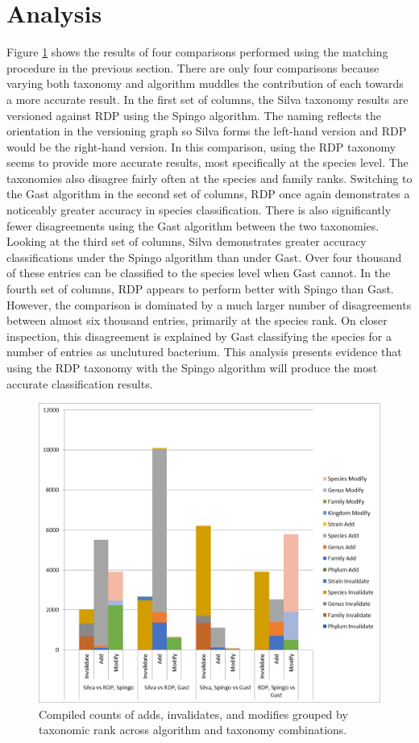 \section{Analysis}

Figure \ref{mbvl_chart} shows the results of four comparisons performed using the matching procedure in the previous section.
There are only four comparisons because varying both taxonomy and algorithm muddles the contribution of each towards a more accurate result.
In the first set of columns, the Silva taxonomy results are versioned against RDP using the Spingo algorithm.
The naming reflects the orientation in the versioning graph so Silva forms the left-hand version and RDP would be the right-hand version.
In this comparison, using the RDP taxonomy seems to provide more accurate results, most specifically at the species level.
The taxonomies also disagree fairly often at the species and family ranks.
Switching to the Gast algorithm in the second set of columns, RDP once again demonstrates a noticeably greater accuracy in species classification.
There is also significantly fewer disagreements using the Gast algorithm between the two taxonomies.
Looking at the third set of columns, Silva demonstrates greater accuracy classifications under the Spingo algorithm than under Gast.
Over four thousand of these entries can be classified to the species level when Gast cannot.
In the fourth set of columns, RDP appears to perform better with Spingo than Gast.
However, the comparison is dominated by a much larger number of disagreements between almost six thousand entries, primarily at the species rank.
On closer inspection, this disagreement is explained by Gast classifying the species for a number of entries as unclutured bacterium.
This analysis presents evidence that using the RDP taxonomy with the Spingo algorithm will produce the most accurate classification results.

\begin{figure}
	\centering
	\includegraphics[scale=0.80]{figures/mbvl_chart.png}
	\caption{Compiled counts of adds, invalidates, and modifies grouped by taxonomic rank across algorithm and taxonomy combinations.}
	\label{mbvl_chart}
\end{figure}